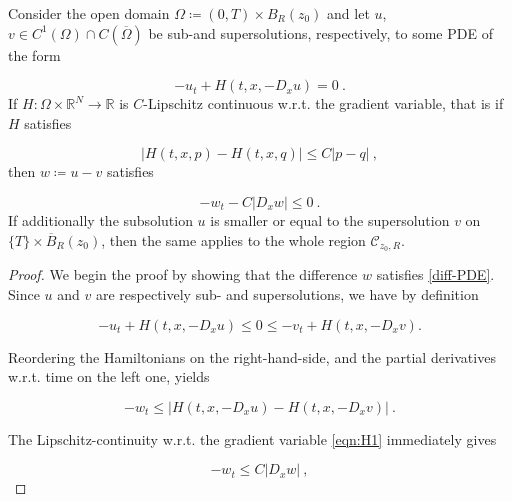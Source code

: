 \begin{theorem}
			\label{smooth_loc} 
			Consider the open domain $ \Omega \coloneqq \left( 0, T \right) \times B_R(z_0) $ and let $ u $, $ v \in C^{1}(\Omega) \cap C(\overline{\Omega}) $ be sub-and supersolutions, respectively, to some PDE of the form
			
			\begin{equation*}
				-u_t + H(t, x, -D_x u) = 0 \ .
			\end{equation*}
			If $ H : \Omega \times \mathbb{R}^{N} \to \mathbb{R} $ is $ C $-Lipschitz continuous w.r.t. the gradient variable, that is if $ H $ satisfies
			
			\begin{equation}
				\tag{H1}
				\lvert H(t, x, p) - H(t, x, q) \rvert \leq C \lvert p - q \rvert \ ,
				\label{eqn:H1}
			\end{equation}
			then $ w \coloneqq u - v $ satisfies
			
			\begin{equation}
				\label{diff-PDE}
				-w_t - C \lvert D_x w \rvert \leq 0 \ .
			\end{equation}
			If additionally the subsolution $ u $ is smaller or equal to the supersolution $ v $ on $ \{ T \} \times \overline{B}_R (z_0) $, then the same applies to the whole region $ \mathcal{C}_{z_0, R} $.
			
			\begin{proof}
				We begin the proof by showing that the difference $ w $ satisfies \eqref{diff-PDE}. Since $ u $ and $ v $ are respectively sub- and supersolutions, we have by definition
				
				\begin{equation*}
					-u_t + H(t, x, -D_x u) \leq 0 \leq -v_t + H(t, x, -D_x v) .
				\end{equation*}
				
				Reordering the Hamiltonians on the right-hand-side, and the partial derivatives w.r.t. time on the left one, yields
				
				\begin{equation*}
					-w_t \leq \lvert H(t, x, -D_x u) - H(t, x, -D_x v) \rvert \ .
				\end{equation*}
				
				The Lipschitz-continuity w.r.t. the gradient variable \eqref{eqn:H1} immediately gives
				
				\begin{equation*}
					-w_t \leq C \lvert D_x w \rvert \ ,
				\end{equation*}
				

\end{proof}
\end{theorem}
